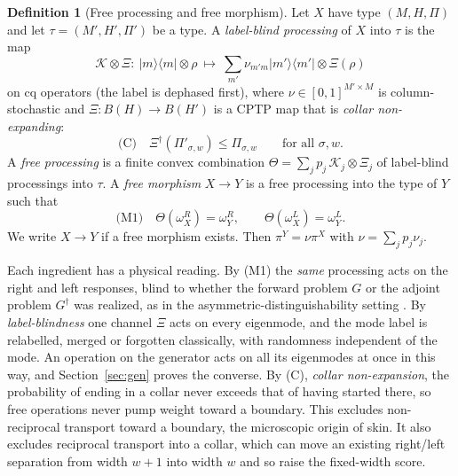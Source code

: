 \documentclass[11pt]{article}
\theoremstyle{definition}
\newtheorem{definition}{Definition}
\theoremstyle{remark}
\newcommand{\proj}[1]{|#1\rangle\!\langle #1|}
\begin{document}
\begin{definition}[Free processing and free morphism]\label{def:mor}
Let $X$ have type $(M,H,\Pi)$ and let $\tau=(M',H',\Pi')$ be a type. A \emph{label-blind processing} of $X$ into $\tau$ is the map
\[
\mathcal K\otimes\Xi:\ \proj m\otimes\rho\ \mapsto\ \textstyle\sum_{m'}\nu_{m'm}\proj{m'}\otimes\Xi(\rho)
\]
on cq operators (the label is dephased first), where $\nu\in[0,1]^{M'\times M}$ is column-stochastic and $\Xi:B(H)\to B(H')$ is a CPTP map that is \emph{collar non-expanding}:
\[
\text{(C)}\quad \Xi^\dagger(\Pi'_{\sigma,w})\le\Pi_{\sigma,w}\qquad\text{for all }\sigma,w .
\]
A \emph{free processing} is a finite convex combination $\Theta=\sum_jp_j\,\mathcal K_j\otimes\Xi_j$ of label-blind processings into $\tau$. A \emph{free morphism} $X\to Y$ is a free processing into the type of $Y$ such that
\[
\text{(M1)}\quad \Theta(\omega^R_X)=\omega^R_Y,\qquad \Theta(\omega^L_X)=\omega^L_Y .
\]
We write $X\to Y$ if a free morphism exists. Then $\pi^Y=\nu\pi^X$ with $\nu=\sum_jp_j\nu_j$.
\end{definition}

Each ingredient has a physical reading. By (M1) the \emph{same} processing acts on the right and left responses, blind to whether the forward problem $G$ or the adjoint problem $G^\dagger$ was realized, as in the asymmetric-distinguishability setting \cite{WW19}. By \emph{label-blindness} one channel $\Xi$ acts on every eigenmode, and the mode label is relabelled, merged or forgotten classically, with randomness independent of the mode. An operation on the generator acts on all its eigenmodes at once in this way, and Section~\ref{sec:gen} proves the converse. By (C), \emph{collar non-expansion}, the probability of ending in a collar never exceeds that of having started there, so free operations never pump weight toward a boundary. This excludes non-reciprocal transport toward a boundary, the microscopic origin of skin. It also excludes reciprocal transport into a collar, which can move an existing right/left separation from width $w+1$ into width $w$ and so raise the fixed-width score.
\end{document}
